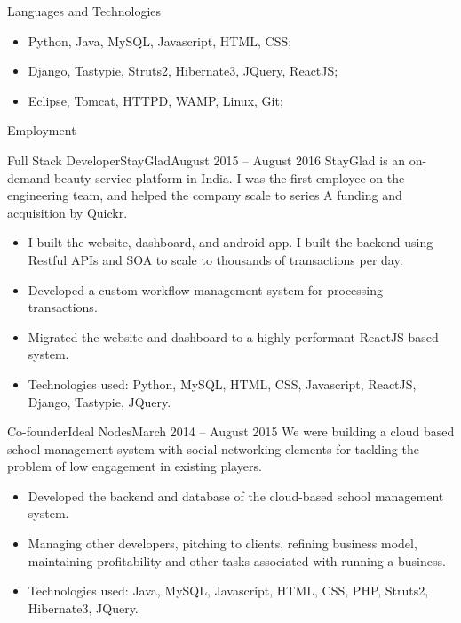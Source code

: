 \documentclass[]{mcdowellcv}
\begin{document}
	\makeheader

	\begin{cvsection}{Languages and Technologies}
		\begin{cvsubsection}{}{}{}	
			\begin{itemize}
				\item Python, Java, MySQL, Javascript, HTML, CSS;
				\item Django, Tastypie, Struts2, Hibernate3, JQuery, ReactJS;
				\item Eclipse, Tomcat, HTTPD, WAMP, Linux, Git;
			\end{itemize}
		\end{cvsubsection}
	\end{cvsection}
	
	\begin{cvsection}{Employment}
		\begin{cvsubsection}{Full Stack Developer}{StayGlad}{August 2015 – August 2016}
			StayGlad is an on-demand beauty service platform in India. I was the first employee on the engineering team, and helped the company scale to series A funding and acquisition by Quickr.
			\begin{itemize}
				\item I built the website, dashboard, and android app. I built the backend using Restful APIs and SOA to scale to thousands of transactions per day.
				\item Developed a custom workflow management system for processing transactions.
				\item Migrated the website and dashboard to a highly performant ReactJS based system.
				\item Technologies used: Python, MySQL, HTML, CSS, Javascript, ReactJS, Django, Tastypie, JQuery.
			\end{itemize}
		\end{cvsubsection}
		
		\begin{cvsubsection}{Co-founder}{Ideal Nodes}{March 2014 – August 2015}	
			We were building a cloud based school management system with social networking elements for tackling the problem of low engagement in existing players.
			\begin{itemize}
				\item Developed the backend and database of the cloud-based school management system.
				\item Managing other developers, pitching to clients, refining business model, maintaining profitability and other tasks associated with running a business.
				\item Technologies used: Java, MySQL, Javascript, HTML, CSS, PHP, Struts2, Hibernate3, JQuery.
			\end{itemize}
		\end{cvsubsection}
		

\end{cvsection}
\end{document}
